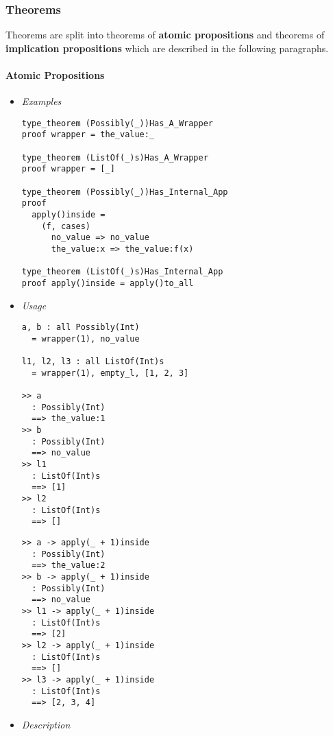 \documentclass{article}
\begin{document}
\newpage

\subsubsection{Theorems}
\label{subsubsec:ttheo}

Theorems are split into theorems of \textbf{atomic propositions} and
theorems of \textbf{implication propositions} which are described in the
following paragraphs.

\paragraph{Atomic Propositions}

\begin{itemize}
\item \textit{Examples}

\begin{verbatim}
type_theorem (Possibly(_))Has_A_Wrapper
proof wrapper = the_value:_

type_theorem (ListOf(_)s)Has_A_Wrapper
proof wrapper = [_]

type_theorem (Possibly(_))Has_Internal_App
proof
  apply()inside =
    (f, cases)
      no_value => no_value
      the_value:x => the_value:f(x)

type_theorem (ListOf(_)s)Has_Internal_App
proof apply()inside = apply()to_all
\end{verbatim}

\item \textit{Usage}

\begin{verbatim} 
a, b : all Possibly(Int)
  = wrapper(1), no_value

l1, l2, l3 : all ListOf(Int)s
  = wrapper(1), empty_l, [1, 2, 3]

>> a
  : Possibly(Int)
  ==> the_value:1
>> b
  : Possibly(Int)
  ==> no_value
>> l1
  : ListOf(Int)s
  ==> [1]
>> l2
  : ListOf(Int)s
  ==> []
\end{verbatim}
\newpage
\begin{verbatim} 
>> a -> apply(_ + 1)inside
  : Possibly(Int)
  ==> the_value:2
>> b -> apply(_ + 1)inside
  : Possibly(Int)
  ==> no_value
>> l1 -> apply(_ + 1)inside
  : ListOf(Int)s
  ==> [2]
>> l2 -> apply(_ + 1)inside
  : ListOf(Int)s
  ==> []
>> l3 -> apply(_ + 1)inside
  : ListOf(Int)s
  ==> [2, 3, 4]
\end{verbatim}

\item \textit{Description}


\end{itemize}
\end{document}
